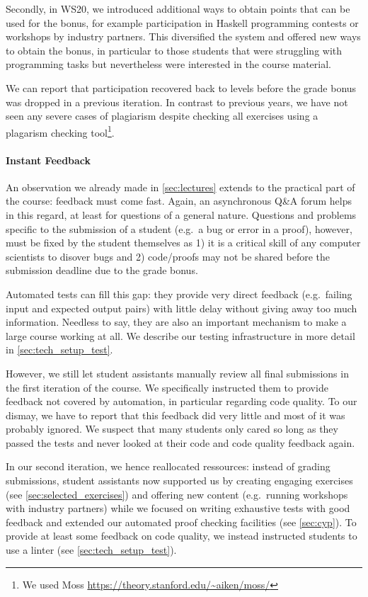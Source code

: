 Secondly, in WS20, we introduced additional ways to
obtain points that can be used for the bonus,
for example participation in Haskell programming contests or workshops by industry partners.
This diversified the system and offered new ways
to obtain the bonus,
in particular to those students that were struggling
with programming tasks but nevertheless were interested in the course material.

We can report that participation recovered
back to levels before the grade bonus was dropped in a previous iteration.
In contrast to previous years,
we have not seen any severe cases of plagiarism despite
checking all exercises using a plagarism checking tool\footnote{We used Moss \url{https://theory.stanford.edu/~aiken/moss/}}.

\paragraph{Instant Feedback}
An observation we already made in \cref{sec:lectures}
extends to the practical part of the course:
feedback must come fast.
Again, an asynchronous Q\&A forum helps in this regard,
at least for questions of a general nature.
Questions and problems specific to the submission of a student (e.g.\ a bug or error in a proof),
however, must be fixed by the student themselves as 1) it is a critical skill of any computer scientists to disover bugs and 2) code/proofs may not be shared before the submission deadline due to the grade bonus.

Automated tests can fill this gap:
they provide very direct feedback (e.g.\ failing input and expected output pairs) with little delay
without giving away too much information.
Needless to say, they are also an important mechanism
to make a large course working at all.
We describe our testing infrastructure in more detail in \cref{sec:tech_setup_test}.

However, we still let student assistants manually review all final submissions
in the first iteration of the course.
We specifically instructed them to provide feedback not covered by automation,
in particular regarding code quality.
To our dismay, we have to report that this feedback did very little and
most of it was probably ignored.
We suspect that many students only cared so long as they passed the tests
and never looked at their code and code quality feedback again.

In our second iteration, we hence reallocated ressources:
instead of grading submissions,
student assistants now supported us by creating engaging exercises
(see \cref{sec:selected_exercises})
and offering new content (e.g.\ running workshops with industry partners)
while we focused on writing exhaustive tests with good feedback and extended our automated proof checking facilities (see \cref{sec:cyp}).
To provide at least some feedback on
code quality, we instead instructed students
to use a linter (see \cref{sec:tech_setup_test}).

